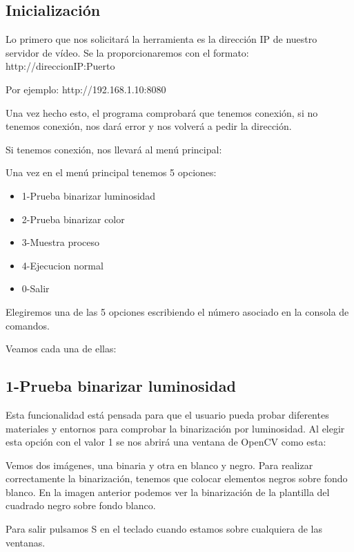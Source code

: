 \subsection{Inicialización}
Lo primero que nos solicitará la herramienta es la dirección IP de nuestro servidor de vídeo. Se la proporcionaremos con el formato: http://direccionIP:Puerto

Por ejemplo: http://192.168.1.10:8080

Una vez hecho esto, el programa comprobará que tenemos conexión, si no tenemos conexión, nos dará error y nos volverá a pedir la dirección.

Si tenemos conexión, nos llevará al menú principal:


Una vez en el menú principal tenemos 5 opciones:

\begin{itemize}
	\item 1-Prueba binarizar luminosidad
	\item 2-Prueba binarizar color
	\item 3-Muestra proceso
	\item 4-Ejecucion normal
	\item 0-Salir
\end{itemize}

Elegiremos una de las 5 opciones escribiendo el número asociado en la consola de comandos.

Veamos cada una de ellas:

\subsection{1-Prueba binarizar luminosidad}
Esta funcionalidad está pensada para que el usuario pueda probar diferentes materiales y entornos para comprobar la binarización por luminosidad. Al elegir esta opción con el valor 1 se nos abrirá una ventana de OpenCV como esta:


Vemos dos imágenes, una binaria y otra en blanco y negro. Para realizar correctamente la binarización, tenemos que colocar elementos negros sobre fondo blanco. En la imagen anterior podemos ver la binarización de la plantilla del cuadrado negro sobre fondo blanco.

Para salir pulsamos S en el teclado cuando estamos sobre cualquiera de las ventanas.

